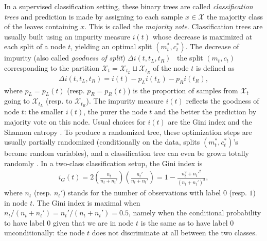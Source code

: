 In a supervised classification setting, these binary trees are called \emph{classification trees} and
prediction is made by assigning to each sample $x \in \mathcal{X}$ the majority class of the leaves containing $x$. This is called the \emph{majority vote}.
Classification trees are usually built using an impurity measure $i(t)$ whose decrease is maximized at each split of a node $t$, yielding an optimal split $(m_t^*, c_t^*)$. The decrease of impurity (also called \emph{goodness of split}) $\Delta i(t, t_L, t_R)$ \wrt~the split $(m_t, c_t)$ corresponding to the partition $\mathcal{X}_t=\mathcal{X}_{t_L}\sqcup \mathcal{X}_{t_R}$ of the node $t$ is defined as
\begin{align}
\label{ocrf:eq:impurity_measure_decrease}
\Delta i(t, t_L, t_R) = i(t) - p_L i(t_L) - p_R i(t_R),
\end{align}
where $p_L = p_L(t)$ (resp. $p_R = p_R(t)$) is the proportion of samples from $\mathcal{X}_t$ going to $\mathcal{X}_{t_L}$ (resp. to $\mathcal{X}_{t_R}$). The impurity measure $i(t)$ reflects the goodness of node $t$: the smaller $i(t)$, the purer the node $t$ and the better the prediction by majority vote on this node. Usual choices for $i(t)$ are the Gini index \citep{Gini1912} and the Shannon entropy \citep{Shannon2001}.
To produce a randomized tree, these optimization steps are usually partially randomized (conditionally on the data, splits $(m_t^*, c_t^*)$'s become random variables), and a classification tree can even be grown totally randomly \citep{Geurts2006}.
%
In a two-class classification setup, the Gini index is
\begin{align}
\label{ocrf:eq:gini}
  i_G(t) = 2\left(\frac{n_t}{n_t + n_t'}\right) \left( \frac{n_t'}{n_t + n_t'}\right) = 1 - \frac{n_t^2 + n_t'^2}{(n_t + n_t')^2},
\end{align}
where $n_t$ (resp. $n_t'$) stands for the number of observations with label $0$ (resp. $1$) in node $t$. The Gini index is maximal when $n_t/(n_t + n_t') = n_t'/(n_t + n_t')=0.5$, namely when the conditional probability to have label $0$ given that we are in node $t$ is the same as to have label $0$ unconditionally: the node $t$ does not discriminate at all between the two classes. %

